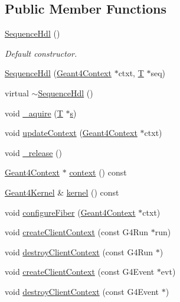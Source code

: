 \subsection*{Public Member Functions}
\begin{DoxyCompactItemize}
\item 
\hyperlink{class_d_d4hep_1_1_simulation_1_1_sequence_hdl_aeb88368d61e8f34a82e6acc1c8794521}{SequenceHdl} ()
\begin{DoxyCompactList}\small\item\em Default constructor. \item\end{DoxyCompactList}\item 
\hyperlink{class_d_d4hep_1_1_simulation_1_1_sequence_hdl_a6a75a0ed136c559a8187ebcf6713a014}{SequenceHdl} (\hyperlink{class_d_d4hep_1_1_simulation_1_1_geant4_context}{Geant4Context} $\ast$ctxt, \hyperlink{class_t}{T} $\ast$seq)
\item 
virtual \hyperlink{class_d_d4hep_1_1_simulation_1_1_sequence_hdl_af01dc42f94e773bcd01406fbcc178f4d}{$\sim$SequenceHdl} ()
\item 
void \hyperlink{class_d_d4hep_1_1_simulation_1_1_sequence_hdl_afe240bb5982f0cdaedc001a3cc1a50da}{\_\-aquire} (\hyperlink{class_t}{T} $\ast$\hyperlink{_volumes_8cpp_a17ca6bfc8040d695d3cada22a4763d40}{s})
\item 
void \hyperlink{class_d_d4hep_1_1_simulation_1_1_sequence_hdl_a6f0b9120d430d93caafb6d3d9f360ecf}{updateContext} (\hyperlink{class_d_d4hep_1_1_simulation_1_1_geant4_context}{Geant4Context} $\ast$ctxt)
\item 
void \hyperlink{class_d_d4hep_1_1_simulation_1_1_sequence_hdl_ad76a439f79bc1844bbcb33e3395c8454}{\_\-release} ()
\item 
\hyperlink{class_d_d4hep_1_1_simulation_1_1_geant4_context}{Geant4Context} $\ast$ \hyperlink{class_d_d4hep_1_1_simulation_1_1_sequence_hdl_ada6e54e8d3522cb4d0a221f630990cf3}{context} () const 
\item 
\hyperlink{class_d_d4hep_1_1_simulation_1_1_geant4_kernel}{Geant4Kernel} \& \hyperlink{class_d_d4hep_1_1_simulation_1_1_sequence_hdl_a642b7c9a8d35ba43e92bb33b7198bcc5}{kernel} () const 
\item 
void \hyperlink{class_d_d4hep_1_1_simulation_1_1_sequence_hdl_a4672c0e560cdc353b48c8025c9d3546f}{configureFiber} (\hyperlink{class_d_d4hep_1_1_simulation_1_1_geant4_context}{Geant4Context} $\ast$ctxt)
\item 
void \hyperlink{class_d_d4hep_1_1_simulation_1_1_sequence_hdl_a6f817d21c75a96ad450c35fd4748d762}{createClientContext} (const G4Run $\ast$run)
\item 
void \hyperlink{class_d_d4hep_1_1_simulation_1_1_sequence_hdl_a0f4ca2107e2527947620c788fe60bc9a}{destroyClientContext} (const G4Run $\ast$)
\item 
void \hyperlink{class_d_d4hep_1_1_simulation_1_1_sequence_hdl_a45cfca253c17c4a89ef63d9367d4c9a4}{createClientContext} (const G4Event $\ast$evt)
\item 
void \hyperlink{class_d_d4hep_1_1_simulation_1_1_sequence_hdl_a8134448bdd2dd9d0e2f5d5834aa6a60f}{destroyClientContext} (const G4Event $\ast$)
\end{DoxyCompactItemize}

